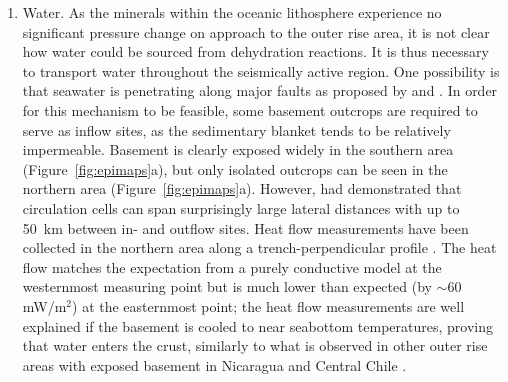 \documentclass[reviewcopy]{elsart}
\begin{document}
\begin{enumerate}
\item Water. As the minerals within the oceanic lithosphere experience
  no significant pressure change on approach to the outer rise area,
  it is not clear how water could be sourced from dehydration
  reactions.  It is thus necessary to transport water throughout the
  seismically active region.   One possibility is that seawater is
  penetrating along major faults as proposed by \citet{ranero03} and
  \citet{peacock01}.   In order for this mechanism to be feasible,
  some basement outcrops are required to serve as inflow sites,
 as the sedimentary blanket tends to be relatively
 impermeable. 
Basement is clearly exposed widely in the southern area
(Figure~\ref{fig:epimaps}a), but only isolated outcrops can be seen in
the northern area (Figure~\ref{fig:epimaps}a).  However,
\citet{fisher03} had demonstrated that circulation cells can span
surprisingly large lateral distances with up to 50~km between in- and
outflow sites.  Heat flow measurements have been collected in the
northern area along a trench-perpendicular profile \citep{heesemann07abs}. The
heat flow matches the expectation from a purely conductive model at
the westernmost measuring point but is much lower than expected (by 
$\sim$60 mW/m$^2$) at the easternmost point; the heat flow
measurements are well explained if the basement is cooled to near
seabottom temperatures, proving that water enters the crust, similarly
to what is observed in other outer rise areas with exposed
basement in Nicaragua and Central Chile \citep{grevemeyer05}.


\end{enumerate}
\end{document}
